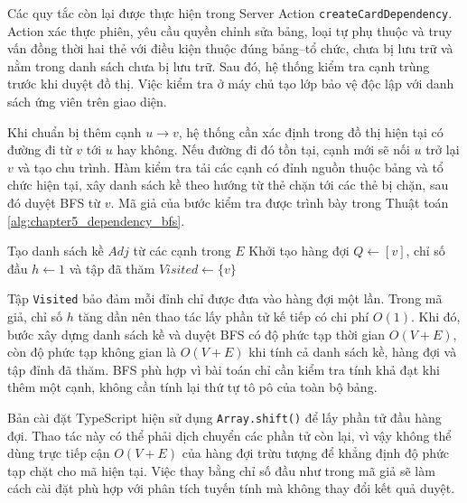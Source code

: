 \documentclass[../DoAn.tex]{subfiles}
\begin{document}
Các quy tắc còn lại được thực hiện trong Server Action \texttt{createCardDependency}. Action xác thực phiên, yêu cầu quyền chỉnh sửa bảng, loại tự phụ thuộc và truy vấn đồng thời hai thẻ với điều kiện thuộc đúng bảng--tổ chức, chưa bị lưu trữ và nằm trong danh sách chưa bị lưu trữ. Sau đó, hệ thống kiểm tra cạnh trùng trước khi duyệt đồ thị. Việc kiểm tra ở máy chủ tạo lớp bảo vệ độc lập với danh sách ứng viên trên giao diện.

Khi chuẩn bị thêm cạnh \(u \rightarrow v\), hệ thống cần xác định trong đồ thị hiện tại có đường đi từ \(v\) tới \(u\) hay không. Nếu đường đi đó tồn tại, cạnh mới sẽ nối \(u\) trở lại \(v\) và tạo chu trình. Hàm kiểm tra tải các cạnh có đỉnh nguồn thuộc bảng và tổ chức hiện tại, xây danh sách kề theo hướng từ thẻ chặn tới các thẻ bị chặn, sau đó duyệt BFS từ \(v\). Mã giả của bước kiểm tra được trình bày trong Thuật toán \ref{alg:chapter5_dependency_bfs}.

\begin{algorithm}[H]
\DontPrintSemicolon
{}
Tạo danh sách kề \(Adj\) từ các cạnh trong \(E\)\;
Khởi tạo hàng đợi \(Q \leftarrow [v]\), chỉ số đầu \(h \leftarrow 1\) và tập đã thăm \(Visited \leftarrow \{v\}\)\;
\;
\caption{Kiểm tra chu trình trước khi thêm quan hệ phụ thuộc}
\label{alg:chapter5_dependency_bfs}
\end{algorithm}

Tập \texttt{Visited} bảo đảm mỗi đỉnh chỉ được đưa vào hàng đợi một lần. Trong mã giả, chỉ số \(h\) tăng dần nên thao tác lấy phần tử kế tiếp có chi phí \(O(1)\). Khi đó, bước xây dựng danh sách kề và duyệt BFS có độ phức tạp thời gian \(O(V+E)\), còn độ phức tạp không gian là \(O(V+E)\) khi tính cả danh sách kề, hàng đợi và tập đỉnh đã thăm. BFS phù hợp vì bài toán chỉ cần kiểm tra tính khả đạt khi thêm một cạnh, không cần tính lại thứ tự tô pô của toàn bộ bảng.

Bản cài đặt TypeScript hiện sử dụng \texttt{Array.shift()} để lấy phần tử đầu hàng đợi. Thao tác này có thể phải dịch chuyển các phần tử còn lại, vì vậy không thể dùng trực tiếp cận \(O(V+E)\) của hàng đợi trừu tượng để khẳng định độ phức tạp chặt cho mã hiện tại. Việc thay bằng chỉ số đầu như trong mã giả sẽ làm cách cài đặt phù hợp với phân tích tuyến tính mà không thay đổi kết quả duyệt.
\end{document}

